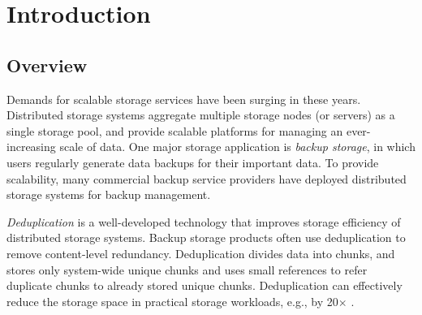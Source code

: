\chapter{Introduction}
\section{Overview}
\label{sec:intro}

Demands for scalable storage services have been surging in these years.
Distributed storage systems aggregate multiple storage nodes (or servers)
as a single storage pool, and provide scalable platforms for managing an
ever-increasing scale of data.  One major storage
application is {\em backup storage}, in which users regularly generate data
backups for their important data.  To provide scalability, many commercial
backup service providers \cite{netbackup, rackspace, hp_whitewater} have
deployed distributed storage systems for backup management. 


{\em Deduplication} is a well-developed technology that improves storage 
efficiency of distributed storage systems. Backup storage products often use
deduplication \cite{zhu08,dubnicki09} to remove content-level redundancy.
Deduplication divides data into chunks, and stores only system-wide unique
chunks and uses small references to refer duplicate chunks to already stored
unique chunks.  Deduplication can effectively reduce the storage space in
practical storage workloads, e.g., by 20$\times$ \cite{andrews13}.  
	




